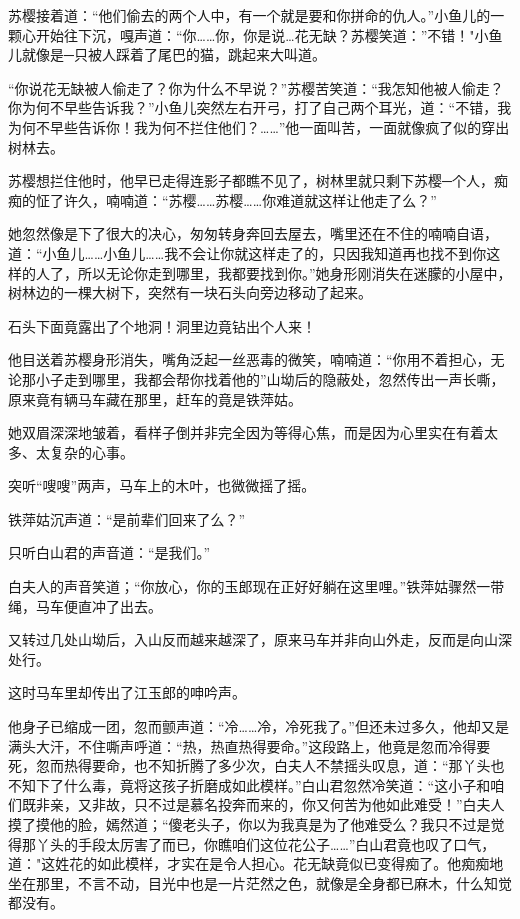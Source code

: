 \documentclass[12pt,oneside]{book}
\begin{document}
苏樱接着道：``他们偷去的两个人中，有一个就是要和你拼命的仇人。''小鱼儿的一颗心开始往下沉，嘎声道：``你\ldots\ldots 你，你是说\ldots 花无缺？苏樱笑道：''不错！"小鱼儿就像是─只被人踩着了尾巴的猫，跳起来大叫道。

``你说花无缺被人偷走了？你为什么不早说？''苏樱苦笑道：``我怎知他被人偷走？你为何不早些告诉我？''小鱼儿突然左右开弓，打了自己两个耳光，道：``不错，我为何不早些告诉你！我为何不拦住他们？\ldots\ldots{}''他一面叫苦，一面就像疯了似的穿出树林去。

苏樱想拦住他时，他早已走得连影子都瞧不见了，树林里就只剩下苏樱─个人，痴痴的怔了许久，喃喃道：``苏樱\ldots\ldots 苏樱\ldots\ldots 你难道就这样让他走了么？''

她忽然像是下了很大的决心，匆匆转身奔回去屋去，嘴里还在不住的喃喃自语，道：``小鱼儿\ldots\ldots 小鱼儿\ldots\ldots 我不会让你就这样走了的，只因我知道再也找不到你这样的人了，所以无论你走到哪里，我都要找到你。''她身形刚消失在迷朦的小屋中，树林边的一棵大树下，突然有一块石头向旁边移动了起来。

石头下面竟露出了个地洞！洞里边竟钻出个人来！

他目送着苏樱身形消失，嘴角泛起一丝恶毒的微笑，喃喃道：``你用不着担心，无论那小子走到哪里，我都会帮你找着他的''山坳后的隐蔽处，忽然传出一声长嘶，原来竟有辆马车藏在那里，赶车的竟是铁萍姑。

她双眉深深地皱着，看样子倒并非完全因为等得心焦，而是因为心里实在有着太多、太复杂的心事。

突听``嗖嗖''两声，马车上的木叶，也微微摇了摇。

铁萍姑沉声道：``是前辈们回来了么？''

只听白山君的声音道：``是我们。''

白夫人的声音笑道；``你放心，你的玉郎现在正好好躺在这里哩。''铁萍姑骤然一带绳，马车便直冲了出去。

又转过几处山坳后，入山反而越来越深了，原来马车并非向山外走，反而是向山深处行。

这时马车里却传出了江玉郎的呻吟声。

他身子已缩成一团，忽而颤声道：``冷\ldots\ldots 冷，冷死我了。''但还未过多久，他却又是满头大汗，不住嘶声呼道：``热，热直热得要命。''这段路上，他竟是忽而冷得要死，忽而热得要命，也不知折腾了多少次，白夫人不禁摇头叹息，道：``那丫头也不知下了什么毒，竟将这孩子折磨成如此模样。''白山君忽然冷笑道：``这小子和咱们既非亲，又非故，只不过是慕名投奔而来的，你又何苦为他如此难受！''白夫人摸了摸他的脸，嫣然道；``傻老头子，你以为我真是为了他难受么？我只不过是觉得那丫头的手段太厉害了而已，你瞧咱们这位花公子\ldots\ldots{}''白山君竟也叹了口气，道："这姓花的如此模样，才实在是令人担心。花无缺竟似已变得痴了。他痴痴地坐在那里，不言不动，目光中也是一片茫然之色，就像是全身都已麻木，什么知觉都没有。
\end{document}

